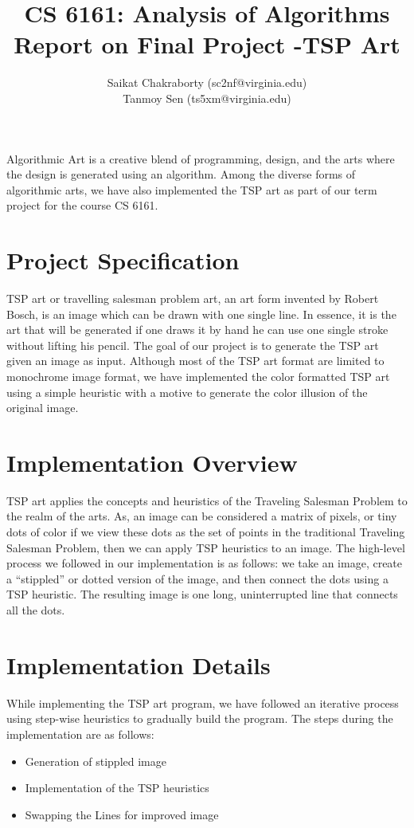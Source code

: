 \documentclass[a4paper,12pt]{article}
\title{CS 6161: Analysis of Algorithms\\
Report on Final Project -TSP Art}
\author{Saikat Chakraborty (sc2nf@virginia.edu)\\Tanmoy Sen (ts5xm@virginia.edu)}
\begin{document}
\date{}
\maketitle

\medskip

Algorithmic Art is a creative blend of programming, design, and the arts where the design is generated using an algorithm. Among the diverse forms of algorithmic arts, we have also implemented the TSP art as part of our term project for the course CS 6161.  

\medskip

\section{Project Specification}
TSP art or travelling salesman problem art, an art form invented by Robert Bosch, is an image which can be drawn with one single line. In essence, it is the art that will be generated if one draws it by hand he can use one single stroke without lifting his pencil. The goal of our project is to generate the TSP art given an image as input. Although most of the TSP art format are limited to monochrome image format, we have implemented the color formatted TSP art using a simple heuristic with a motive to generate the color illusion of the original image.    

\medskip

\section{Implementation Overview}
TSP art applies the concepts and heuristics of the Traveling Salesman Problem to the realm of the arts. As, an image can be considered a matrix of pixels, or tiny dots of color if we view these dots as the set of points in the traditional Traveling Salesman Problem, then we can apply TSP heuristics to an image. The high-level process we followed in our implementation is as follows: we take an image, create a “stippled” or dotted version of the image, and then connect the dots using a TSP heuristic. The resulting image is one long, uninterrupted line that connects all the dots.

\medskip

 
\section{Implementation Details}
While implementing the TSP art program, we have followed an iterative process using step-wise heuristics to gradually build the program. The steps during the implementation are as follows:
\begin{itemize}
    \item Generation of stippled image
    \item Implementation of the TSP heuristics
    \item Swapping the Lines for improved image
\end{itemize}
\end{document}
